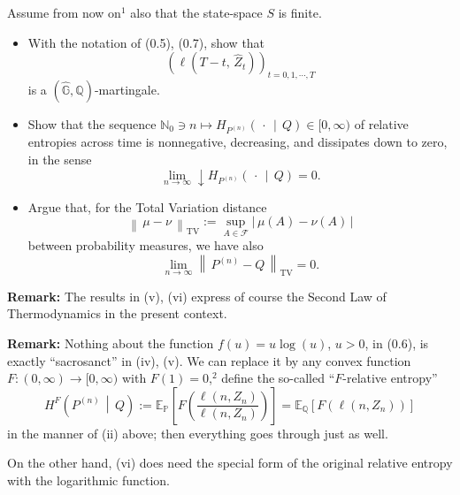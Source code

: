 Assume from now on$^1$ also that the state-space $S$ is finite.

\begin{itemize}
    \item[(iv)] With the notation of (0.5), (0.7), show that
    \[
        \left(\ell\!\left(T-t,\, \widehat{Z}_t\right)\right)_{t=0,1,\cdots,T}
    \]
    is a $(\widehat{\mathbb{G}}, \mathbb{Q})$-martingale.

    \item[(v)] Show that the sequence $\mathbb{N}_0 \ni n \mapsto H_{P^{(n)}}\!\left(\,\cdot\,\middle|\,Q\right) \in [0,\infty)$ of relative entropies across time is nonnegative, decreasing, and dissipates down to zero, in the sense
    \[
        \lim_{n \to \infty} \downarrow H_{P^{(n)}}\!\left(\,\cdot\,\middle|\,Q\right) = 0.
    \]

    \item[(vi)] Argue that, for the Total Variation distance
    \[
        \left\|\,\mu - \nu\,\right\|_{\mathrm{TV}} := \sup_{A \in \mathcal{F}} \left|\,\mu(A) - \nu(A)\,\right|
    \]
    between probability measures, we have also
    \[
        \lim_{n \to \infty} \left\|\,P^{(n)} - Q\,\right\|_{\mathrm{TV}} = 0.
    \]
\end{itemize}

\textbf{Remark:} The results in (v), (vi) express of course the Second Law of Thermodynamics in the present context.

\textbf{Remark:} Nothing about the function $f(u) = u\log(u)$, $u > 0$, in (0.6), is exactly ``sacrosanct'' in (iv), (v). We can replace it by any convex function $F : (0,\infty) \to [0,\infty)$ with $F(1) = 0$,$^2$ define the so-called ``$F$-relative entropy''
\[
    H^F\!\left(P^{(n)}\,\middle|\,Q\right) := \mathbb{E}_{\mathbb{P}}\!\left[F\!\left(\frac{\ell(n,Z_n)}{\ell(n,Z_n)}\right)\right] = \mathbb{E}_{\mathbb{Q}}\!\left[F\!\left(\ell(n,Z_n)\right)\right]
\]
in the manner of (ii) above; then everything goes through just as well.

On the other hand, (vi) does need the special form of the original relative entropy with the logarithmic function.

